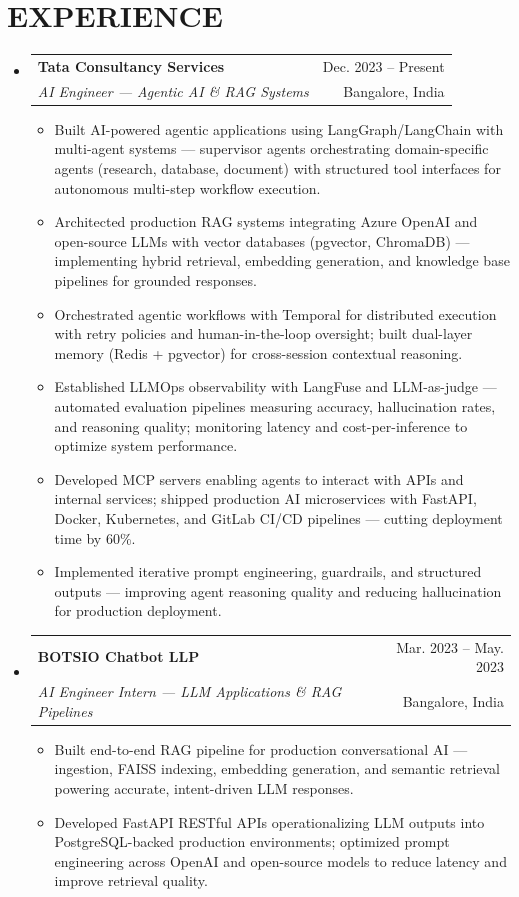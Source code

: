 \documentclass[letterpaper,10pt]{article}
\makeatletter
\newcommand{\resumeItem}[1]{
  \item\small{
    {#1 \vspace{-2pt}} 
  }
}
\newcommand{\resumeSubheading}[4]{
  \vspace{-2pt}\item 
    \begin{tabular*}{\textwidth}[t]{l@{\extracolsep{\fill}}r}
      \textbf{#1} & {\color{dark-grey}\small #2}\vspace{1pt}\\ 
      \textit{#3} & {\color{dark-grey} \small #4}\\ 
    \end{tabular*}\vspace{-6pt} 
}
\newcommand{\resumeSubHeadingListStart}{\begin{itemize}[leftmargin=0in, label={}]}
\newcommand{\resumeSubHeadingListEnd}{\end{itemize}\vspace{-8pt}}
\newcommand{\resumeItemListStart}{\begin{itemize}}
\newcommand{\resumeItemListEnd}{\end{itemize}\vspace{-6pt}}
\makeatother
\begin{document}
\section{EXPERIENCE}
  \resumeSubHeadingListStart
    \resumeSubheading
      {Tata Consultancy Services}{Dec. 2023 -- Present}
      {AI Engineer — Agentic AI \& RAG Systems}{Bangalore, India}
      \resumeItemListStart
        \resumeItem{Built AI-powered agentic applications using LangGraph/LangChain with multi-agent systems — supervisor agents orchestrating domain-specific agents (research, database, document) with structured tool interfaces for autonomous multi-step workflow execution.}
        \resumeItem{Architected production RAG systems integrating Azure OpenAI and open-source LLMs with vector databases (pgvector, ChromaDB) — implementing hybrid retrieval, embedding generation, and knowledge base pipelines for grounded responses.}
        \resumeItem{Orchestrated agentic workflows with Temporal for distributed execution with retry policies and human-in-the-loop oversight; built dual-layer memory (Redis + pgvector) for cross-session contextual reasoning.}
        \resumeItem{Established LLMOps observability with LangFuse and LLM-as-judge — automated evaluation pipelines measuring accuracy, hallucination rates, and reasoning quality; monitoring latency and cost-per-inference to optimize system performance.}
        \resumeItem{Developed MCP servers enabling agents to interact with APIs and internal services; shipped production AI microservices with FastAPI, Docker, Kubernetes, and GitLab CI/CD pipelines — cutting deployment time by 60\%.}
        \resumeItem{Implemented iterative prompt engineering, guardrails, and structured outputs — improving agent reasoning quality and reducing hallucination for production deployment.}
      \resumeItemListEnd
    \resumeSubheading
      {BOTSIO Chatbot LLP}{Mar. 2023 -- May. 2023}
      {AI Engineer Intern — LLM Applications \& RAG Pipelines}{Bangalore, India}
      \resumeItemListStart
        \resumeItem{Built end-to-end RAG pipeline for production conversational AI — ingestion, FAISS indexing, embedding generation, and semantic retrieval powering accurate, intent-driven LLM responses.}
        \resumeItem{Developed FastAPI RESTful APIs operationalizing LLM outputs into PostgreSQL-backed production environments; optimized prompt engineering across OpenAI and open-source models to reduce latency and improve retrieval quality.}
      \resumeItemListEnd
  \resumeSubHeadingListEnd
\end{document}
